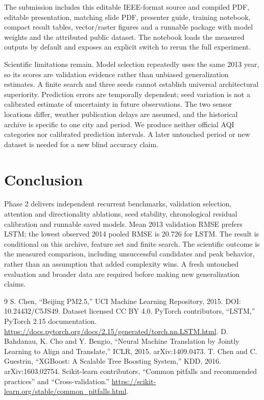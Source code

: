 \documentclass[conference]{IEEEtran}
\begin{document}
The submission includes this editable IEEE-format source and compiled PDF, editable presentation, matching slide PDF, presenter guide, training notebook, compact result tables, vector/raster figures and a runnable package with model weights and the attributed public dataset. The notebook loads the measured outputs by default and exposes an explicit switch to rerun the full experiment.

Scientific limitations remain. Model selection repeatedly uses the same 2013 year, so its scores are validation evidence rather than unbiased generalization estimates. A finite search and three seeds cannot establish universal architectural superiority. Prediction errors are temporally dependent; seed variation is not a calibrated estimate of uncertainty in future observations. The two sensor locations differ, weather publication delays are assumed, and the historical archive is specific to one city and period. We produce neither official AQI categories nor calibrated prediction intervals. A later untouched period or new dataset is needed for a new blind accuracy claim.

\section{Conclusion}
Phase 2 delivers independent recurrent benchmarks, validation selection, attention and directionality ablations, seed stability, chronological residual calibration and runnable saved models. Mean 2013 validation RMSE prefers LSTM; the lowest observed 2014 pooled RMSE is 20.726 for LSTM. The result is conditional on this archive, feature set and finite search. The scientific outcome is the measured comparison, including unsuccessful candidates and peak behavior, rather than an assumption that added complexity wins. A fresh untouched evaluation and broader data are required before making new generalization claims.

\begin{thebibliography}{9}
 S. Chen, ``Beijing PM2.5,'' UCI Machine Learning Repository, 2015. DOI: 10.24432/C5JS49. Dataset licensed CC BY 4.0.
 PyTorch contributors, ``LSTM,'' PyTorch 2.15 documentation. \url{https://docs.pytorch.org/docs/2.15/generated/torch.nn.LSTM.html}.
 D. Bahdanau, K. Cho and Y. Bengio, ``Neural Machine Translation by Jointly Learning to Align and Translate,'' ICLR, 2015. arXiv:1409.0473.
 T. Chen and C. Guestrin, ``XGBoost: A Scalable Tree Boosting System,'' KDD, 2016. arXiv:1603.02754.
 Scikit-learn contributors, ``Common pitfalls and recommended practices'' and ``Cross-validation.'' \url{https://scikit-learn.org/stable/common_pitfalls.html}.
\end{thebibliography}
\end{document}
